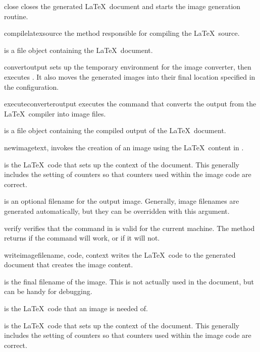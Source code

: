 \begin{methoddesc}[Imager]{close}{}
closes the generated \LaTeX\ document and starts the image generation routine.
\end{methoddesc}

\begin{methoddesc}[Imager]{compilelatex}{source}
the method responsible for compiling the \LaTeX\ source.

 is a file object containing the \LaTeX\ document.
\end{methoddesc}

\begin{methoddesc}[Imager]{convert}{output}
sets up the temporary environment for the image converter, then executes
.  It also moves the generated images into
their final location specified in the configuration.
\end{methoddesc}

\begin{methoddesc}[Imager]{executeconverter}{output}
executes the command that converts the output from the \LaTeX\ compiler
into image files.

 is a file object containing the compiled output of the 
\LaTeX\ document.
\end{methoddesc}

\begin{methoddesc}[Imager]{newimage}{text, }
invokes the creation of an image using the \LaTeX\ content in .

 is the \LaTeX\ code that sets up the context of the document.
This generally includes the setting of counters so that counters used
within the image code are correct.

 is an optional filename for the output image.  Generally, 
image filenames are generated automatically, but they can be overridden
with this argument.
\end{methoddesc}

\begin{methoddesc}[Imager]{verify}{}
verifies that the command in  is valid for the current
machine.  The  method returns  if the command will
work, or  if it will not.
\end{methoddesc}

\begin{methoddesc}[Imager]{writeimage}{filename, code, context}
writes the \LaTeX\ code to the generated document that creates the 
image content.

 is the final filename of the image.  This is not actually
used in the document, but can be handy for debugging.

 is the \LaTeX\ code that an image is needed of.

 is the \LaTeX\ code that sets up the context of the document.
This generally includes the setting of counters so that counters used
within the image code are correct.
\end{methoddesc}


